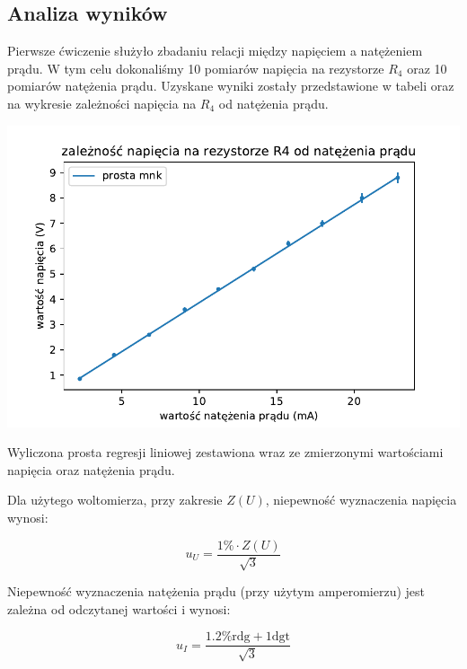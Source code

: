 \documentclass[a4paper]{article}
\begin{document}
\subsection{Analiza wyników}

Pierwsze ćwiczenie służyło zbadaniu relacji między napięciem a natężeniem prądu.
W tym celu dokonaliśmy 10 pomiarów napięcia na rezystorze $R_4$ oraz 10 pomiarów natężenia prądu.
Uzyskane wyniki zostały przedstawione w tabeli oraz na wykresie zależności napięcia na $R_4$ od natężenia prądu.

\begin{table}
\centering
\includegraphics[scale=0.7]{fig_d.pdf}
\caption{Wyliczona prosta regresji liniowej zestawiona wraz ze zmierzonymi wartościami napięcia oraz natężenia prądu.}
\end{table}

Dla użytego woltomierza, przy zakresie $Z(U)$, niepewność wyznaczenia napięcia wynosi:

$$u_U = \frac{1\% \cdot Z(U)}{\sqrt{3}}$$

Niepewność wyznaczenia natężenia prądu (przy użytym amperomierzu) jest zależna od odczytanej wartości i wynosi:

$$u_I = \frac{1.2\% \text{rdg} + 1 \text{dgt}}{\sqrt{3}}$$
\end{document}
